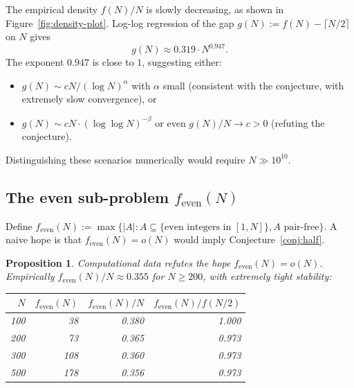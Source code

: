 \documentclass[11pt]{amsart}
\theoremstyle{plain}
\newtheorem{proposition}[theorem]{Proposition}
\theoremstyle{definition}
\begin{document}
The empirical density $f(N)/N$ is slowly decreasing, as shown in Figure~\ref{fig:density-plot}. Log-log regression of the gap $g(N) := f(N) - \lceil N/2 \rceil$ on $N$ gives
\[
  g(N) \approx 0.319 \cdot N^{0.947}.
\]
The exponent $0.947$ is close to $1$, suggesting either:
\begin{itemize}
  \item $g(N) \sim c N / (\log N)^{\alpha}$ with $\alpha$ small (consistent with the conjecture, with extremely slow convergence), or
  \item $g(N) \sim c N \cdot (\log\log N)^{-\beta}$ or even $g(N)/N \to c > 0$ (refuting the conjecture).
\end{itemize}
Distinguishing these scenarios numerically would require $N \gg 10^{10}$.

\subsection{The even sub-problem $f_{\text{even}}(N)$}

Define $f_{\text{even}}(N) := \max\{|A| : A \subseteq \{\text{even integers in } [1, N]\}, A \text{ pair-free}\}$. A naive hope is that $f_{\text{even}}(N) = o(N)$ would imply Conjecture~\ref{conj:half}.

\begin{proposition}\label{prop:feven-fails}
Computational data refutes the hope $f_{\text{even}}(N) = o(N)$. Empirically $f_{\text{even}}(N)/N \approx 0.355$ for $N \geq 200$, with extremely tight stability:

\begin{center}
\begin{tabular}{r|r|r|r}
$N$  & $f_{\text{even}}(N)$ & $f_{\text{even}}(N)/N$ & $f_{\text{even}}(N)/f(N/2)$ \\
\hline
100  & 38   & 0.380  & 1.000 \\
200  & 73   & 0.365  & 0.973 \\
300  & 108  & 0.360  & 0.973 \\
500  & 178  & 0.356  & 0.973 \\
\end{tabular}
\end{center}
\end{proposition}
\end{document}
